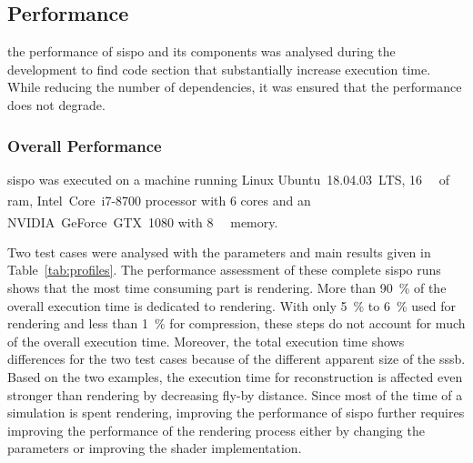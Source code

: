 \subsection{Performance}
the performance of \gls{sispo} and its components was analysed during the development to find code section that substantially increase execution time. While reducing the number of dependencies, it was ensured that the performance does not degrade.

\subsubsection{Overall Performance}
\gls{sispo} was executed on a machine running Linux Ubuntu~18.04.03~LTS, \SI{16}{\giga\byte} of \gls{ram}, Intel\textsuperscript{\textregistered}~Core\texttrademark~i7-8700 processor with \SI{6}{} cores and an NVIDIA\textsuperscript{\textregistered}~GeForce~GTX~1080 with \SI{8}{\giga\byte} memory.

Two test cases were analysed with the parameters and main results given in Table~\ref{tab:profiles}. The performance assessment of these complete \gls{sispo} runs shows that the most time consuming part is rendering. More than \SI{90}{\percent} of the overall execution time is dedicated to rendering. With only \SI{5}{\percent} to \SI{6}{\percent} used for rendering and less than \SI{1}{\percent} for compression, these steps do not account for much of the overall execution time. Moreover, the total execution time shows differences for the two test cases because of the different apparent size of the \gls{sssb}. Based on the two examples, the execution time for reconstruction is affected even stronger than rendering by decreasing fly-by distance.
Since most of the time of a simulation is spent rendering, improving the performance of \gls{sispo} further requires improving the performance of the rendering process either by changing the parameters or improving the shader implementation.

